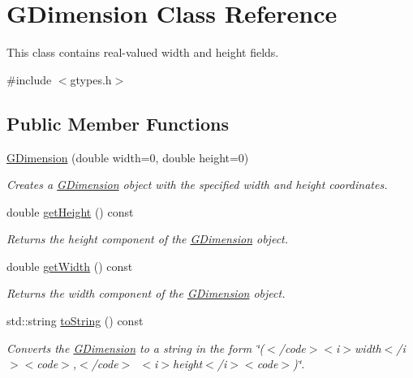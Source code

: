 \hypertarget{classGDimension}{}\section{G\+Dimension Class Reference}
\label{classGDimension}


This class contains real-\/valued width and height fields.  




{\ttfamily \#include $<$gtypes.\+h$>$}

\subsection*{Public Member Functions}
\begin{DoxyCompactItemize}
\item 
\mbox{\hyperlink{classGDimension_a6b8171acdd56ca62c8bea0f73bd27ea7}{G\+Dimension}} (double width=0, double height=0)
\begin{DoxyCompactList}\small\item\em Creates a {\ttfamily \mbox{\hyperlink{classGDimension}{G\+Dimension}}} object with the specified {\ttfamily width} and {\ttfamily height} coordinates. \end{DoxyCompactList}\item 
double \mbox{\hyperlink{classGDimension_a1e7e353362434072875264cf95629f99}{get\+Height}} () const
\begin{DoxyCompactList}\small\item\em Returns the height component of the {\ttfamily \mbox{\hyperlink{classGDimension}{G\+Dimension}}} object. \end{DoxyCompactList}\item 
double \mbox{\hyperlink{classGDimension_a0ed2965abd4f5701d2cadf71239faf19}{get\+Width}} () const
\begin{DoxyCompactList}\small\item\em Returns the width component of the {\ttfamily \mbox{\hyperlink{classGDimension}{G\+Dimension}}} object. \end{DoxyCompactList}\item 
std\+::string \mbox{\hyperlink{classGDimension_a1fe5121d6528fdea3f243321b3fa3a49}{to\+String}} () const
\begin{DoxyCompactList}\small\item\em Converts the {\ttfamily \mbox{\hyperlink{classGDimension}{G\+Dimension}}} to a string in the form {\ttfamily \char`\"{}($<$/code$>$$<$i$>$width$<$/i$>$$<$code$>$,$<$/code$>$~$<$i$>$height$<$/i$>$$<$code$>$)\char`\"{}}. \end{DoxyCompactList}\end{DoxyCompactItemize}


